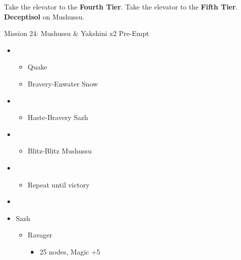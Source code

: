 \begin{multicols}{2}
Take the elevator to the \textbf{Fourth Tier}.
Take the elevator to the \textbf{Fifth Tier}.
\textbf{Deceptisol} on Mushussu.

\begin{battle}{Mission 24: Mushussu \& Yakshini x2 Pre-Empt}
\begin{itemize}
    \item \first
    \begin{itemize}
        \item Quake
        \item Bravery-Enwater Snow
    \end{itemize}
    \item \fifth
    \begin{itemize}
        \item Haste-Bravery Sazh
    \end{itemize}
    \item \fourth
    \begin{itemize}
        \item Blitz-Blitz Mushussu
    \end{itemize}
    \item \second
    \begin{itemize}
        \item Repeat until victory
    \end{itemize}
\end{itemize}
\end{battle}
\vfill
\begin{menu}
\begin{itemize}
    \paradigm
    \begin{itemize}
        \item {}%
{\paradigmline[1]{\textit{\syn}}{\textit{\sab}}{\textit{\rav}}}%
{\paradigmline{\com}{\med}{\com}}%
{\paradigmline{\syn}{\med}{\com}}%
{\paradigmline{\com}{\sab}{\com}}%
{\paradigmline{(\rav)}{\sab}{(\rav)}}%
{\paradigmline{\com}{\rav}{\com}}
    \end{itemize}
    \crystarium
    \begin{itemize}
        \item Sazh
        \begin{itemize}
            \item Ravager
            \begin{itemize}
                \item 25 nodes, Magic +5
            \end{itemize}

\end{itemize}
\end{itemize}
\end{itemize}
\end{menu}
\end{multicols}
